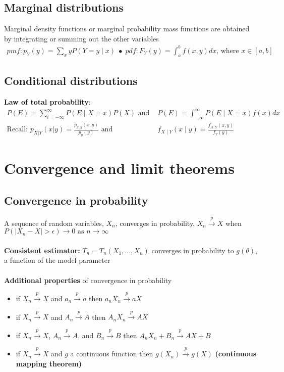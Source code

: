 \documentclass{article}
\newcommand{\abs}[1]{\lvert#1\rvert}
\begin{document}
\subsection{Marginal distributions}
Marginal density functions or marginal probability mass functions are obtained by integrating or summing out the other variables
\begin{align*}
    pmf:  p_Y(y) = \sum_x y P(Y = y \mid x)\; \bullet \; pdf: F_Y(y) = \int_a^b f(x,y)dx \textrm{, where } x \in [a,b]
\end{align*}

\subsection{Conditional distributions}
\textbf{Law of total probability}:
\begin{align*}
    P(E) = \sum_{i=-\infty}^\infty P(E \mid X = x)P(X) \textrm{ and } &P(E) = \int_{-\infty}^\infty P(E \mid X=x)f(x)dx\\
    \textrm{Recall: } p_{X|Y}(x|y) = \frac{p_{x,y}(x,y)}{p_y(y)} \textrm{ and } &f_{X\mid Y}(x \mid y) = \frac{f_{X,Y}(x, y)}{f_Y(y)}
\end{align*}



\section{Convergence and limit theorems}
\subsection{Convergence in probability}
A sequence of random variables, $X_n$, converges in probability, $X_n \overset{p}{\longrightarrow} X$ when
$P(\abs{X_n - X} > \epsilon) \longrightarrow 0 \textrm{ as } n \longrightarrow \infty$\\\\
\textbf{Consistent estimator:} $T_n = T_n(X_1, \dots, X_n)$ converges in probability to $g(\theta)$, a function of the model parameter\\\\
\textbf{Additional properties} of convergence in probability
\begin{itemize}
    \item if $X_n \overset{p}{\longrightarrow} X$ and $a_n \overset{p}{\longrightarrow} a$ then $a_nX_n \overset{p}{\longrightarrow} aX$
    \item if $X_n \overset{p}{\longrightarrow} X$ and $A_n \overset{p}{\longrightarrow} A$ then $A_nX_n \overset{p}{\longrightarrow} AX$
    \item if $X_n \overset{p}{\longrightarrow} X$, $A_n \overset{p}{\longrightarrow} A$, and $B_n \overset{p}{\longrightarrow} B$ then $A_nX_n + B_n \overset{p}{\longrightarrow} AX + B$
    \item if $X_n \overset{p}{\longrightarrow} X$ and $g$ a continuous function then $g(X_n) \overset{p}{\longrightarrow} g(X)$ \textbf{(continuous mapping theorem)}
\end{itemize}
\end{document}
